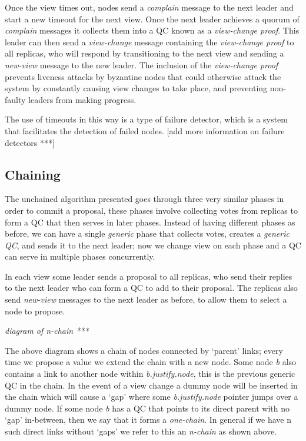 Once the view times out, nodes send a \textit{complain} message to the next leader and start a new timeout for the next view. Once the next leader achieves a quorum of \textit{complain} messages it collects them into a QC known as a \textit{view-change proof}. This leader can then send a \textit{view-change} message containing the \textit{view-change proof} to all replicas, who will respond by transitioning to the next view and sending a \textit{new-view} message to the new leader. The inclusion of the \textit{view-change proof} prevents liveness attacks by byzantine nodes that could otherwise attack the system by constantly causing view changes to take place, and preventing non-faulty leaders from making progress.

The use of timeouts in this way is a type of failure detector, which is a system that facilitates the detection of failed nodes. [add more information on failure detectors ***]
\subsection{Chaining}
The unchained algorithm presented goes through three very similar phases in order to commit a proposal, these phases involve collecting votes from replicas to form a QC that then serves in later phases. Instead of having different phases as before, we can have a single \textit{generic} phase that collects votes, creates a \textit{generic QC}, and sends it to the next leader; now we change view on each phase and a QC can serve in multiple phases concurrently.

In each view some leader sends a proposal to all replicas, who send their replies to the next leader who can form a QC to add to their proposal. The replicas also send \textit{new-view} messages to the next leader as before, to allow them to select a node to propose.

\textit{diagram of n-chain ***}

The above diagram shows a chain of nodes connected by `parent' links; every time we propose a value we extend the chain with a new node. Some node \textit{b} also contains a link to another node within \textit{b.justify.node}, this is the previous generic QC in the chain. In the event of a view change a dummy node will be inserted in the chain which will cause a `gap' where some \textit{b.justify.node} pointer jumps over a dummy node. If some node \textit{b} has a QC that points to its direct parent with no `gap' in-between, then we say that it forms a \textit{one-chain}. In general if we have n such direct links without `gaps' we refer to this an \textit{n-chain} as shown above.

